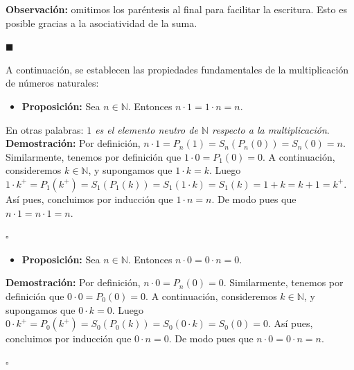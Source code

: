 \documentclass[10 pt]{article}
\begin{document}
\Large{\textbf{Observación:} omitimos los paréntesis al final para facilitar la escritura. Esto es posible gracias a la asociatividad de la suma.} \\

\begin{flushright}
    $\blacksquare$
\end{flushright}

\Large{A continuación, se establecen las propiedades fundamentales de la multiplicación de números naturales:} \\

\begin{itemize}
    \item \Large{\textbf{Proposición:} Sea $n \in \mathbb N$. Entonces $n \cdot 1=1 \cdot n=n$.} \\
\end{itemize}

\Large{En otras palabras: \textit{$1$ es el elemento neutro de $\mathbb N$ respecto a la multiplicación}.} \\

\Large{\textbf{Demostración:} Por definición, $n \cdot 1=P_n(1)=S_n(P_n(0))=S_n(0)=n$. Similarmente, tenemos por definición que $1 \cdot 0=P_1(0)=0$. A continuación, consideremos $k \in \mathbb N$, y supongamos que $1 \cdot k=k$. Luego $1 \cdot k^+=P_1(k^+)=S_1(P_1(k))=S_1(1 \cdot k)=S_1(k)=1+k=k+1=k^+$. Así pues, concluimos por inducción que $1 \cdot n=n$. De modo pues que $n \cdot 1=n \cdot 1=n$.} \\

\begin{flushright}
    $\square$
\end{flushright}

\begin{itemize}
    \item \Large{\textbf{Proposición:} Sea $n \in \mathbb N$. Entonces $n \cdot 0=0 \cdot n=0$.} \\
\end{itemize}

\Large{\textbf{Demostración:} Por definición, $n \cdot 0=P_n(0)=0$. Similarmente, tenemos por definición que $0 \cdot 0=P_0(0)=0$. A continuación, consideremos $k \in \mathbb N$, y supongamos que $0 \cdot k=0$. Luego $0 \cdot k^+=P_0(k^+)=S_0(P_0(k))=S_0(0 \cdot k)=S_0(0)=0$. Así pues, concluimos por inducción que $0 \cdot n=0$. De modo pues que $n \cdot 0=0 \cdot n=n$.} \\

\begin{flushright}
    $\square$
\end{flushright}
\end{document}
